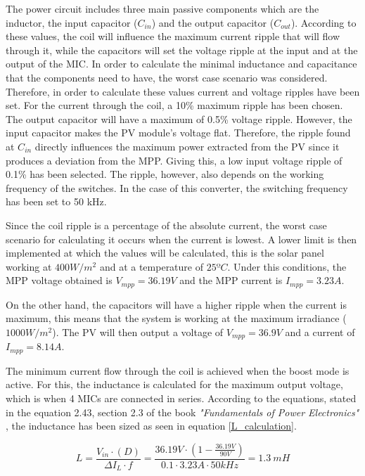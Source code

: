 The power circuit includes three main passive components which are the inductor, the input capacitor ($C_{in}$) and the output capacitor ($C_{out}$). According to these values, the coil will influence the maximum current ripple that will flow through it, while the capacitors will set the voltage ripple at the input and at the output of the MIC. In order to calculate the minimal inductance and capacitance that the components need to have, the worst case scenario was considered.
\label{sec:componentsizing}
Therefore, in order to calculate these values current and voltage ripples have been set. For the current through the coil, a 10\% maximum ripple has been chosen. The output capacitor will  have a maximum of 0.5\% voltage ripple. However, the input capacitor makes the PV module's voltage flat. Therefore, the ripple found at $C_{in}$ directly influences the maximum power extracted from the PV since it produces a deviation from the MPP. Giving this, a low input voltage ripple of 0.1\% has been selected. The ripple, however, also depends on the working frequency of the switches. In the case of this converter, the switching frequency has been set to 50 kHz. 

Since the coil ripple is a percentage of the absolute current, the worst case scenario for calculating it occurs when the current is lowest. A lower limit is then implemented at which the values will be calculated, this is the solar panel working at $400 W/m^2$ and at a temperature of $25 ºC$. Under this conditions, the MPP voltage obtained is $V_{mpp} = 36.19 V$ and the MPP current is $I_{mpp} = 3.23A$.

On the other hand, the capacitors will have a higher ripple when the current is maximum, this means that the system is working at the maximum irradiance ($1000 W/m^2$). The PV will then output a voltage of $V_{mpp} = 36.9 V$ and a current of $I_{mpp} = 8.14 A$.

The minimum current flow through the coil is achieved when the boost mode is active. For this, the inductance is calculated for the maximum output voltage, which is when 4 MICs are connected in series. According to the equations, stated in the equation 2.43, section 2.3 of the book \textit{"Fundamentals of Power Electronics"} \cite{Erickson}, the inductance has been sized as seen in equation \ref{L_calculation}.

\begin{equation} \label{L_calculation}
L = \frac{V_{in} \cdot (D)}{\Delta I_{L} \cdot f} = \frac{36.19 V \cdot (1-\frac{36.19V}{90V})}{0.1 \cdot 3.23 A \cdot 50 kHz} = 1.3 \ mH
\end{equation}

